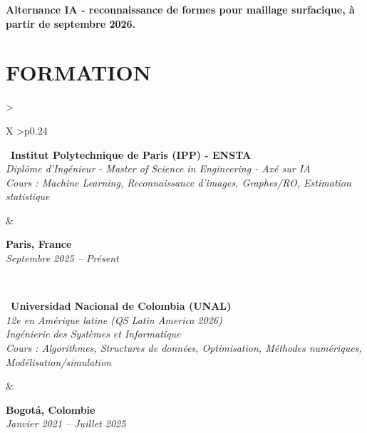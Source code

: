 \documentclass[letterpaper,10pt]{article}
\begin{document}
\textbf{Alternance IA - reconnaissance de formes pour maillage surfacique, à partir de septembre 2026.} 


\vspace{0.08cm}

\section{\textcolor{mydarkgreen}{\textbf{FORMATION}}}

\begin{tabularx}{\textwidth}{>{\raggedright\arraybackslash}X >{\raggedleft\arraybackslash}p{0.24\textwidth}}
  \begin{minipage}[t]{\linewidth}\raggedright
  \textbullet\ \textbf{Institut Polytechnique de Paris (IPP) - ENSTA}\\
  \textit{\footnotesize Diplôme d'Ingénieur - Master of Science in Engineering - Axé sur IA}\\
  \textit{\footnotesize Cours : Machine Learning, Reconnaissance d'images, Graphes/RO, Estimation statistique}
  \end{minipage}
  &
  \begin{minipage}[t]{\linewidth}\raggedleft
  \textbf{Paris, France}\\
  {\footnotesize\textit{Septembre 2025 -- Présent}}
  \end{minipage}
  \\
  \begin{minipage}[t]{\linewidth}
  \textbullet\ \textbf{Universidad Nacional de Colombia (UNAL)}\\
  \textit{\footnotesize 12e en Amérique latine (QS Latin America 2026)}\\
  \textit{\footnotesize Ingénierie des Systèmes et Informatique}\\
  \textit{\footnotesize Cours : Algorithmes, Structures de données, Optimisation, Méthodes numériques, Modélisation/simulation}
  \end{minipage}
  &
  \begin{minipage}[t]{\linewidth}\raggedleft
  \textbf{Bogotá, Colombie}\\
  {\footnotesize\textit{Janvier 2021 -- Juillet 2025}}
  \end{minipage}

\end{tabularx}
\end{document}
